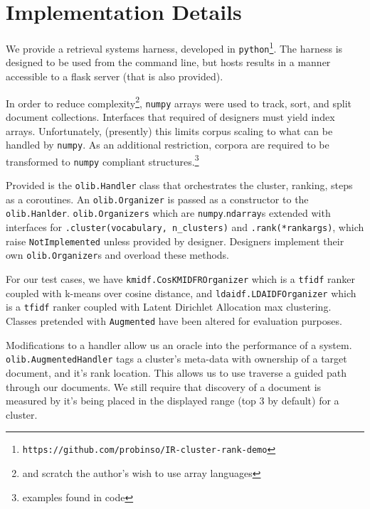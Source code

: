 \documentclass[11pt]{article}
\def\site{\texttt{https://github.com/probinso/IR-cluster-rank-demo}\xspace}
\def\tfidf{\texttt{tfidf}\xspace}
\def\python{\texttt{python}\xspace}
\def\np{\texttt{numpy}\xspace}
\begin{document}

\section{Implementation Details}
We provide a retrieval systems harness, developed in \python\footnote{\site}. The
harness is designed to be used from the command line, but hosts results in a manner
accessible to a flask server (that is also provided).

In order to reduce complexity\footnote{and scratch the author's wish to use array languages},
\np arrays were used to track, sort, and split document collections. Interfaces that
required of designers must yield index arrays. Unfortunately, (presently) this limits
corpus scaling to what can be handled by \np. As an additional restriction, corpora are
required to be transformed to \np compliant structures.\footnote{examples found in code}

Provided is the \texttt{olib.Handler} class that orchestrates the cluster, ranking,
steps as a coroutines. An \texttt{olib.Organizer} is passed as a constructor to the
\texttt{olib.Hanlder}.
\texttt{olib.Organizers} which are \np.\texttt{ndarray}s extended with interfaces for
\texttt{.cluster(vocabulary, n\_clusters)} and \texttt{.rank(*rankargs)}, which raise
\texttt{NotImplemented} unless provided by designer. Designers implement their own
\texttt{olib.Organizer}s and overload these methods.

For our test cases, we have \texttt{kmidf.CosKMIDFROrganizer} which is a \tfidf
ranker coupled with k-means over cosine distance, and \texttt{ldaidf.LDAIDFOrganizer}
which is a \tfidf ranker coupled with Latent Dirichlet Allocation max clustering.
Classes pretended with \texttt{Augmented} have been altered for evaluation purposes.

Modifications to a handler allow us an oracle into the performance of a system.
\texttt{olib.AugmentedHandler} tags a cluster's meta-data with ownership of a target
document, and it's rank location. This allows us to use traverse a guided path
through our documents. We still require that discovery of a document is measured by
it's being placed in the displayed range (top 3 by default) for a cluster.

\end{document}
